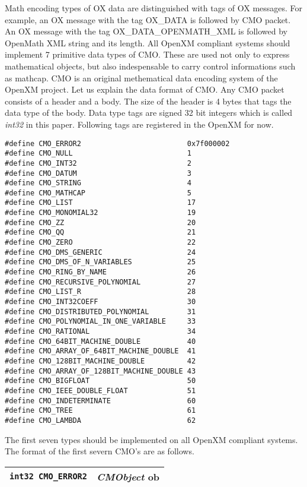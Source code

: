Math encoding types of OX data are distinguished with tags
of OX messages.
For example,
an OX message with the tag 
OX\_DATA is followed by CMO packet.
An OX message with the tag 
OX\_DATA\_OPENMATH\_XML is followed by 
OpenMath XML string and its length.
All OpenXM compliant systems should implement 7 primitive data types
of CMO.
These are used not only to express mathematical objects, but also
indespensable to carry control informations such as mathcap.
CMO is an original methematical data encoding system of the OpenXM project.
Let us explain the data format of CMO.
Any CMO packet consists of a header and a body.
The size of the header is 4 bytes that tags the data type of the body.
Data type tags are signed 32 bit integers which is called {\sl int32} in this
paper.
Following tags are registered in the OpenXM for now.
\begin{verbatim}
#define CMO_ERROR2                         0x7f000002
#define CMO_NULL                           1
#define CMO_INT32                          2
#define CMO_DATUM                          3
#define CMO_STRING                         4
#define CMO_MATHCAP                        5
#define CMO_LIST                           17
#define CMO_MONOMIAL32                     19
#define CMO_ZZ                             20
#define CMO_QQ                             21
#define CMO_ZERO                           22
#define CMO_DMS_GENERIC                    24
#define CMO_DMS_OF_N_VARIABLES             25
#define CMO_RING_BY_NAME                   26
#define CMO_RECURSIVE_POLYNOMIAL           27
#define CMO_LIST_R                         28
#define CMO_INT32COEFF                     30
#define CMO_DISTRIBUTED_POLYNOMIAL         31
#define CMO_POLYNOMIAL_IN_ONE_VARIABLE     33
#define CMO_RATIONAL                       34
#define CMO_64BIT_MACHINE_DOUBLE           40
#define CMO_ARRAY_OF_64BIT_MACHINE_DOUBLE  41
#define CMO_128BIT_MACHINE_DOUBLE          42
#define CMO_ARRAY_OF_128BIT_MACHINE_DOUBLE 43
#define CMO_BIGFLOAT                       50
#define CMO_IEEE_DOUBLE_FLOAT              51
#define CMO_INDETERMINATE                  60
#define CMO_TREE                           61
#define CMO_LAMBDA                         62
\end{verbatim}
The first seven types should be implemented on all OpenXM compliant systems.
The format of the first severn CMO's are as follows. \\
\begin{tabular}{|c|c|}
\hline
{\tt int32 CMO\_ERROR2} & {\sl CMObject} {\rm ob} \\ 
\hline
\end{tabular} \\
